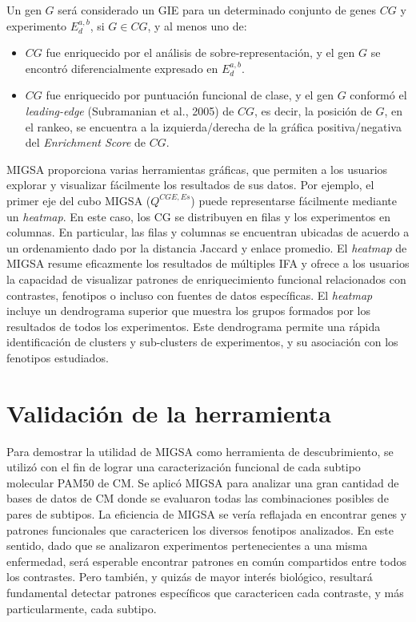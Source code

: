 \documentclass[12pt,twoside]{reedthesis}
\providecommand{\tightlist}{%
  \setlength{\itemsep}{0pt}\setlength{\parskip}{0pt}}
\begin{document}
\par

Un gen \(G\) será considerado un GIE para un determinado conjunto de genes \(CG\) y experimento \(E_{d}^{a,b}\), si \(G \in CG\), y al menos uno de:
\begin{itemize}
\tightlist
\item
  \(CG\) fue enriquecido por el análisis de sobre-representación, y el gen \(G\) se encontró diferencialmente expresado en \(E_{d}^{a,b}\).
\item
  \(CG\) fue enriquecido por puntuación funcional de clase, y el gen \(G\) conformó el \emph{leading-edge} (Subramanian et al., 2005) de \(CG\), es decir, la posición de \(G\), en el rankeo, se encuentra a la izquierda/derecha de la gráfica positiva/negativa del \emph{Enrichment Score} de \(CG\).
\end{itemize}
\par

MIGSA proporciona varias herramientas gráficas, que permiten a los usuarios explorar y visualizar fácilmente los resultados de sus datos. Por ejemplo, el primer eje del cubo MIGSA (\(Q^{CGE,Es}\)) puede representarse fácilmente mediante un \emph{heatmap}. En este caso, los CG se distribuyen en filas y los experimentos en columnas. En particular, las filas y columnas se encuentran ubicadas de acuerdo a un ordenamiento dado por la distancia Jaccard y enlace promedio. El \emph{heatmap} de MIGSA resume eficazmente los resultados de múltiples IFA y ofrece a los usuarios la capacidad de visualizar patrones de enriquecimiento funcional relacionados con contrastes, fenotipos o incluso con fuentes de datos específicas. El \emph{heatmap} incluye un dendrograma superior que muestra los grupos formados por los resultados de todos los experimentos. Este dendrograma permite una rápida identificación de clusters y sub-clusters de experimentos, y su asociación con los fenotipos estudiados.

\hypertarget{validaciuxf3n-de-la-herramienta}{%
\section{Validación de la herramienta}\label{validaciuxf3n-de-la-herramienta}}

\par

Para demostrar la utilidad de MIGSA como herramienta de descubrimiento, se utilizó con el fin de lograr una caracterización funcional de cada subtipo molecular PAM50 de CM. Se aplicó MIGSA para analizar una gran cantidad de bases de datos de CM donde se evaluaron todas las combinaciones posibles de pares de subtipos. La eficiencia de MIGSA se vería reflajada en encontrar genes y patrones funcionales que caractericen los diversos fenotipos analizados. En este sentido, dado que se analizaron experimentos pertenecientes a una misma enfermedad, será esperable encontrar patrones en común compartidos entre todos los contrastes. Pero también, y quizás de mayor interés biológico, resultará fundamental detectar patrones específicos que caractericen cada contraste, y más particularmente, cada subtipo.
\end{document}

